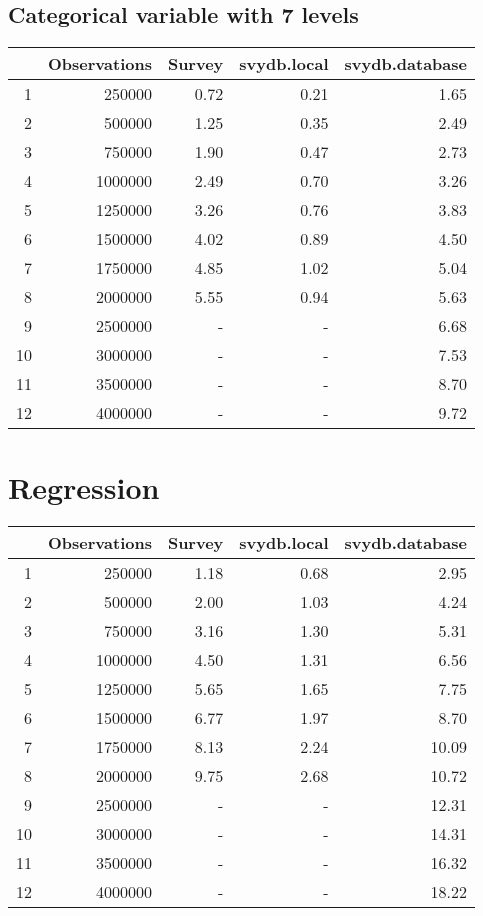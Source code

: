 \subsection{Categorical variable with 7 levels}
\begin{table}[ht]
\centering
\begin{tabular}{rrrrr}
  \hline
 & Observations & Survey & svydb.local & svydb.database \\ 
  \hline
1 & 250000 & 0.72 & 0.21 & 1.65 \\ 
  2 & 500000 & 1.25 & 0.35 & 2.49 \\ 
  3 & 750000 & 1.90 & 0.47 & 2.73 \\ 
  4 & 1000000 & 2.49 & 0.70 & 3.26 \\ 
  5 & 1250000 & 3.26 & 0.76 & 3.83 \\ 
  6 & 1500000 & 4.02 & 0.89 & 4.50 \\ 
  7 & 1750000 & 4.85 & 1.02 & 5.04 \\ 
  8 & 2000000 & 5.55 & 0.94 & 5.63 \\ 
  9 & 2500000 & - & - & 6.68 \\ 
  10 & 3000000 & - & - & 7.53 \\ 
  11 & 3500000 & - & - & 8.70 \\ 
  12 & 4000000 & - & - & 9.72 \\ 
   \hline
\end{tabular}
\end{table}

\newpage 

\section{Regression}
\begin{table}[ht]
\centering
\begin{tabular}{rrrrr}
  \hline
 & Observations & Survey & svydb.local & svydb.database \\ 
  \hline
1 & 250000 & 1.18 & 0.68 & 2.95 \\ 
  2 & 500000 & 2.00 & 1.03 & 4.24 \\ 
  3 & 750000 & 3.16 & 1.30 & 5.31 \\ 
  4 & 1000000 & 4.50 & 1.31 & 6.56 \\ 
  5 & 1250000 & 5.65 & 1.65 & 7.75 \\ 
  6 & 1500000 & 6.77 & 1.97 & 8.70 \\ 
  7 & 1750000 & 8.13 & 2.24 & 10.09 \\ 
  8 & 2000000 & 9.75 & 2.68 & 10.72 \\ 
  9 & 2500000 & - & - & 12.31 \\ 
  10 & 3000000 & - & - & 14.31 \\ 
  11 & 3500000 & - & - & 16.32 \\ 
  12 & 4000000 & - & - & 18.22 \\ 
   \hline
\end{tabular}
\end{table}

